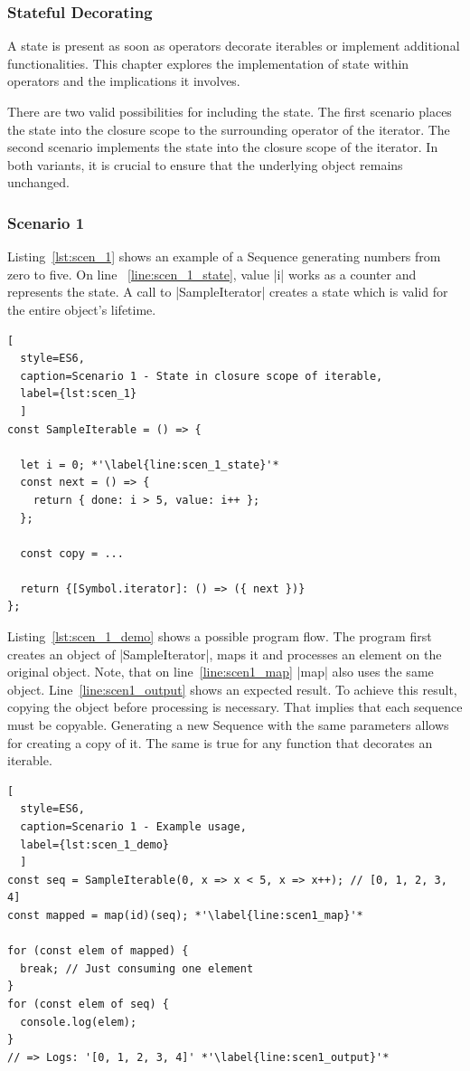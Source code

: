 \subsubsection{Stateful Decorating}
\label{subsub:Stateful Decorating}
A state is present as soon as operators decorate iterables or implement 
additional functionalities. This chapter explores the implementation of state
within operators and the implications it involves.

There are two valid possibilities for including the state.
The first scenario places the state into the closure scope to the surrounding 
operator of the iterator. The second scenario implements the state into the 
closure scope of the iterator. In both variants, it is crucial to ensure that 
the underlying object remains unchanged.

\subsubsection{Scenario 1}
Listing~\ref{lst:scen_1} shows an example of a Sequence generating numbers from
zero to five. On line ~\ref{line:scen_1_state}, value |i| works as a counter 
and represents the state. 
A call to |SampleIterator| creates a state which is valid for the entire 
object's lifetime.

\begin{lstlisting}[
  style=ES6, 
  caption=Scenario 1 - State in closure scope of iterable,
  label={lst:scen_1}
  ]
const SampleIterable = () => {

  let i = 0; *'\label{line:scen_1_state}'*
  const next = () => {
    return { done: i > 5, value: i++ };
  };

  const copy = ...

  return {[Symbol.iterator]: () => ({ next })}
};
\end{lstlisting}

Listing~\ref{lst:scen_1_demo} shows a possible program flow. 
The program first creates an object of |SampleIterator|, maps it and processes
an element on the original object. Note, that on line~\ref{line:scen1_map} |map| also 
uses the same object. Line~\ref{line:scen1_output} shows an expected result. 
To achieve this result, copying the object before processing is necessary.
That implies that each sequence must be copyable. Generating a new 
Sequence with the same parameters allows for creating a copy of it. 
The same is true for any function that decorates an iterable.

\begin{lstlisting}[
  style=ES6, 
  caption=Scenario 1 - Example usage,
  label={lst:scen_1_demo}
  ]
const seq = SampleIterable(0, x => x < 5, x => x++); // [0, 1, 2, 3, 4]
const mapped = map(id)(seq); *'\label{line:scen1_map}'*

for (const elem of mapped) {
  break; // Just consuming one element
}
for (const elem of seq) {
  console.log(elem);
}
// => Logs: '[0, 1, 2, 3, 4]' *'\label{line:scen1_output}'*
\end{lstlisting}

